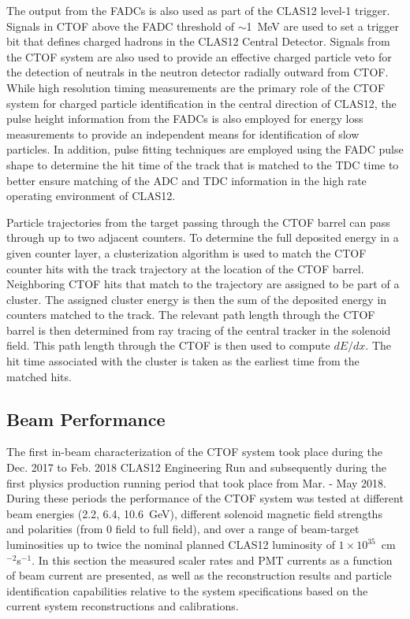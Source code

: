 \documentclass{elsart}
\begin{document}
The output from the FADCs is also used as part of the CLAS12 level-1 trigger. Signals in CTOF above
the FADC threshold of $\sim$1~MeV are used to set a trigger bit that defines charged hadrons in the
CLAS12 Central Detector. Signals from the CTOF system are also used to provide an effective charged
particle veto for the detection of neutrals in the neutron detector radially outward from CTOF. While high
resolution timing measurements are the primary role of the CTOF system for charged particle identification
in the central direction of CLAS12, the pulse height information from the FADCs is also employed for energy
loss measurements to provide an independent means for identification of slow particles. In addition, pulse
fitting techniques are employed using the FADC pulse shape to determine the hit time of the track that is
matched to the TDC time to better ensure matching of the ADC and TDC information in the high rate
operating environment of CLAS12.

Particle trajectories from the target passing through the CTOF barrel can pass through up to two adjacent
counters. To determine the full deposited energy in a given counter layer, a clusterization algorithm is used
to match the CTOF counter hits with the track trajectory at the location of the CTOF barrel. Neighboring
CTOF hits that match to the trajectory are assigned to be part of a cluster. The assigned cluster energy is
then the sum of the deposited energy in counters matched to the track. The relevant path length through
the CTOF barrel is then determined from ray tracing of the central tracker in the solenoid field. This path
length through the CTOF is then used to compute $dE/dx$. The hit time associated with the cluster is
taken as the earliest time from the matched hits.
  
\subsection{Beam Performance}  
\label{sec:beam}

The first in-beam characterization of the CTOF system took place during the Dec. 2017 to Feb. 2018
CLAS12 Engineering Run and subsequently during the first physics production running period that
took place from Mar. - May 2018. During these periods the performance of the CTOF system was
tested at different beam energies (2.2, 6.4, 10.6~GeV), different solenoid magnetic field strengths
and polarities (from 0 field to full field), and over a range of beam-target luminosities up to twice the
nominal planned CLAS12 luminosity of $1 \times 10^{35}$~cm$^{-2}$s$^{-1}$. In this section the
measured scaler rates and PMT currents as a function of beam current are presented, as well as the
reconstruction results and particle identification capabilities relative to the system specifications
based on the current system reconstructions and calibrations.
\end{document}
